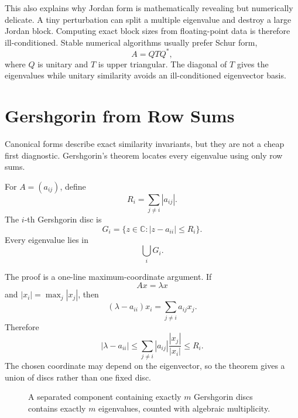 This also explains why Jordan form is mathematically revealing but numerically delicate.  A tiny perturbation can split a multiple eigenvalue and destroy a large Jordan block.  Computing exact block sizes from floating-point data is therefore ill-conditioned.  Stable numerical algorithms usually prefer Schur form,
\[
  A=QTQ^*,
\]
where \(Q\) is unitary and \(T\) is upper triangular.  The diagonal of \(T\) gives the eigenvalues while unitary similarity avoids an ill-conditioned eigenvector basis.

\section{Gershgorin from Row Sums}

Canonical forms describe exact similarity invariants, but they are not a cheap first diagnostic.  Gershgorin's theorem locates every eigenvalue using only row sums.

For \(A=(a_{ij})\), define
\[
  R_i=\sum_{j\ne i}|a_{ij}|.
\]
The \(i\)-th Gershgorin disc is
\[
  G_i=\{z\in\mathbb C:|z-a_{ii}|\le R_i\}.
\]
Every eigenvalue lies in
\[
  \bigcup_iG_i.
\]

The proof is a one-line maximum-coordinate argument.  If
\[
  Ax=\lambda x
\]
and \(|x_i|=\max_j|x_j|\), then
\[
  (\lambda-a_{ii})x_i
  =\sum_{j\ne i}a_{ij}x_j.
\]
Therefore
\[
  |\lambda-a_{ii}|
  \le
  \sum_{j\ne i}|a_{ij}|
  \frac{|x_j|}{|x_i|}
  \le R_i.
\]
The chosen coordinate may depend on the eigenvector, so the theorem gives a union of discs rather than one fixed disc.

\begin{figure}[H]
\centering
{}
\caption{A separated component containing exactly $m$ Gershgorin discs contains exactly $m$ eigenvalues, counted with algebraic multiplicity.}
\end{figure}

